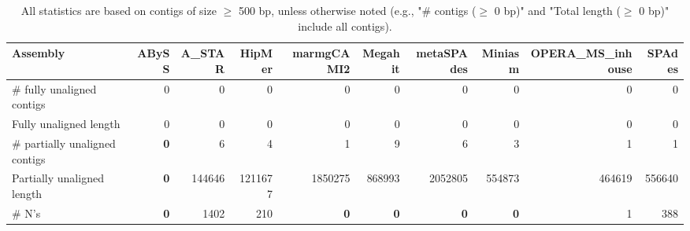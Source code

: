 \documentclass[12pt,a4paper]{article}
\begin{document}
\begin{table}[ht]
\begin{center}
\caption{All statistics are based on contigs of size $\geq$ 500 bp, unless otherwise noted (e.g., "\# contigs ($\geq$ 0 bp)" and "Total length ($\geq$ 0 bp)" include all contigs).}
\begin{tabular}{|l*{9}{|r}|}
\hline
Assembly & ABySS & A\_STAR & HipMer & marmgCAMI2 & Megahit & metaSPAdes & Miniasm & OPERA\_MS\_inhouse & SPAdes \\ \hline
\# fully unaligned contigs & 0 & 0 & 0 & 0 & 0 & 0 & 0 & 0 & 0 \\ \hline
Fully unaligned length & 0 & 0 & 0 & 0 & 0 & 0 & 0 & 0 & 0 \\ \hline
\# partially unaligned contigs & {\bf 0} & 6 & 4 & 1 & 9 & 6 & 3 & 1 & 1 \\ \hline
Partially unaligned length & {\bf 0} & 144646 & 1211677 & 1850275 & 868993 & 2052805 & 554873 & 464619 & 556640 \\ \hline
\# N's & {\bf 0} & 1402 & 210 & {\bf 0} & {\bf 0} & {\bf 0} & {\bf 0} & 1 & 388 \\ \hline
\end{tabular}
\end{center}
\end{table}
\end{document}
